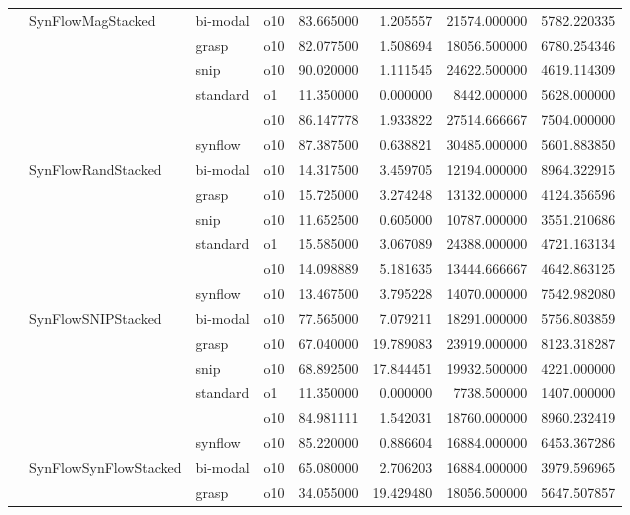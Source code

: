 \begin{longtable}{llllrrrr}
      & SynFlowMagStacked & bi-modal & o10 &  83.665000 &   1.205557 &     21574.000000 &   5782.220335 \\
      &     & grasp & o10 &  82.077500 &   1.508694 &     18056.500000 &   6780.254346 \\
      &     & snip & o10 &  90.020000 &   1.111545 &     24622.500000 &   4619.114309 \\
      &     & standard & o1 &  11.350000 &   0.000000 &      8442.000000 &   5628.000000 \\
      &     &         & o10 &  86.147778 &   1.933822 &     27514.666667 &   7504.000000 \\
      &     & synflow & o10 &  87.387500 &   0.638821 &     30485.000000 &   5601.883850 \\
      & SynFlowRandStacked & bi-modal & o10 &  14.317500 &   3.459705 &     12194.000000 &   8964.322915 \\
      &     & grasp & o10 &  15.725000 &   3.274248 &     13132.000000 &   4124.356596 \\
      &     & snip & o10 &  11.652500 &   0.605000 &     10787.000000 &   3551.210686 \\
      &     & standard & o1 &  15.585000 &   3.067089 &     24388.000000 &   4721.163134 \\
      &     &         & o10 &  14.098889 &   5.181635 &     13444.666667 &   4642.863125 \\
      &     & synflow & o10 &  13.467500 &   3.795228 &     14070.000000 &   7542.982080 \\
      & SynFlowSNIPStacked & bi-modal & o10 &  77.565000 &   7.079211 &     18291.000000 &   5756.803859 \\
      &     & grasp & o10 &  67.040000 &  19.789083 &     23919.000000 &   8123.318287 \\
      &     & snip & o10 &  68.892500 &  17.844451 &     19932.500000 &   4221.000000 \\
      &     & standard & o1 &  11.350000 &   0.000000 &      7738.500000 &   1407.000000 \\
      &     &         & o10 &  84.981111 &   1.542031 &     18760.000000 &   8960.232419 \\
      &     & synflow & o10 &  85.220000 &   0.886604 &     16884.000000 &   6453.367286 \\
      & SynFlowSynFlowStacked & bi-modal & o10 &  65.080000 &   2.706203 &     16884.000000 &   3979.596965 \\
      &     & grasp & o10 &  34.055000 &  19.429480 &     18056.500000 &   5647.507857 \\

\end{longtable}
